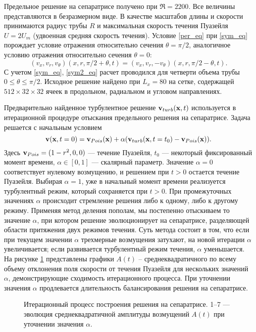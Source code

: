 Предельное решение на сепаратрисе получено при $\Re=2200$. Все величины представляются в безразмерном виде. В качестве масштабов длины и скорости принимаются радиус трубы $R$ и максимальная скорость течения Пуазейля $U = 2U_m$ (удвоенная средняя скорость течения). Условие \eqref{per_eq} при \eqref{sym_eq} порождает условие отражения относительно сечения $\theta = \pi/2$, аналогичное условию отражения относительно сечения $\theta = 0$:
\begin{equation} \label{sym2_eq}
(v_x, v_r, v_\theta)(x, r, \pi/2 + \theta, t) = (v_x, v_r, -v_\theta)(x, r, \pi / 2 - \theta, t).
\end{equation}
С учетом \eqref{sym_eq}, \eqref{sym2_eq} расчет проводился для четверти объема трубы $0\leqslant\theta\leqslant\pi/2$. Исходное решение найдено при $L_x = 80$ на сетке, содержащей $512 \times 32 \times  32$ ячеек в продольном, радиальном и угловом направлениях. 

Предварительно найденное турбулентное решение $\mathbf{v}_{turb}(\mathbf{x},t)$ используется в итерационной процедуре отыскания предельного решения на сепаратрисе. Задача решается с начальным условием
\begin{equation} \label{edge_init_eq}
\mathbf{v}(\mathbf{x},t=0) = \mathbf{v}_{Pois}(\mathbf{x})+\alpha(\mathbf{v}_{turb}(\mathbf{x},t=t_0) - \mathbf{v}_{Pois}(\mathbf{x})).
\end{equation}
Здесь $\mathbf{v}_{Pois}=(1-r^2,0,0)$ --- течение Пуазейля, $t_0$ --- некоторый фиксированный момент времени, $\alpha \in [0,1]$ --- скалярный параметр. Значение $\alpha=0$ соответствует нулевому возмущению, и решением при $t > 0$ остается течение Пуазейля. Выбирая $\alpha=1$, уже в начальный момент времени реализуется турбулентный режим, который сохраняется при $t > 0$. При промежуточных значениях $\alpha$ происходит стремление решения либо к одному, либо к другому режиму. Применяя метод деления пополам, мы постепенно отыскиваем то значение $\alpha$, при котором решение эволюционирует на сепаратрисе, разделяющей области притяжения двух режимов течения. Суть метода состоит в том, что если при текущем значении $\alpha$ трехмерные возмущения затухают, на новой итерации $\alpha$ увеличивается; если развивается турбулентный режим течения, $\alpha$ уменьшается. На рисунке \ref{bisection_pic} представлены графики $A(t)$ – среднеквадратичного по всему объему отклонения поля скорости от течения Пуазейля для нескольких значений $\alpha$, демонстрирующие сходимость итерационного процесса. При уточнении значения $\alpha$ продлевается длительность балансирования решения на сепаратрисе.


\begin{figure}
\caption{Итерационный процесс построения решения на сепаратрисе. 1--7 --- эволюция среднеквадратичной амплитуды возмущений $A(t)$ при уточнении значения $\alpha$.}
\label{bisection_pic}
\end{figure}

